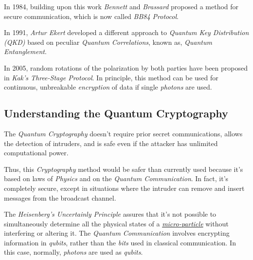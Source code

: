 \documentclass[conference]{IEEEtran}
\begin{document}
\vspace{4pt}

In 1984, building upon this work \textit{Bennett} and \textit{Brassard} proposed a method for secure communication, which is now called \textit{BB84 Protocol}.

\vspace{4pt}

In 1991, \textit{Artur Ekert} developed a different approach to \textit{Quantum Key Distribution (QKD)} based on peculiar \textit{Quantum Correlations}, known as, \textit{Quantum Entanglement}.

\vspace{4pt}

In 2005, random rotations of the polarization by both parties have been proposed in \textit{Kak's Three-Stage Protocol}. In principle, this method can be used for continuous, unbreakable \textit{encryption} of data if single \textit{photons} are used.

\vspace{6pt}

\subsection{Understanding the Quantum Cryptography}\label{A4}

The \textit{Quantum Cryptography} doesn't require prior secret communications, allows the detection of intruders, and is safe even if the attacker has unlimited computational power.

\vspace{4pt}

Thus, this \textit{Cryptography} method would be safer than currently used because it's based on laws of \textit{Physics} and on the \textit{Quantum Communication}. In fact, it's completely secure, except in situations where the intruder can remove and insert messages from the broadcast channel.

\vspace{4pt}

The \textit{Heisenberg's Uncertainly Principle} assures that it's not possible to simultaneously determine all the physical states of a \href{https://en.wikipedia.org/wiki/Microparticle}{\textit{micro-particle}} without interfering or altering it. The \textit{Quantum Communication} involves encrypting information in \textit{qubits}, rather than the \textit{bits} used in classical communication. In this case, normally, \textit{photons} are used as \textit{qubits}.
\end{document}
